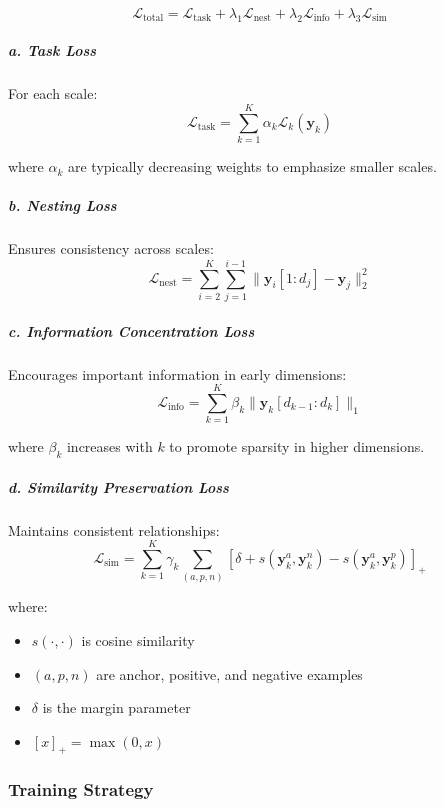 \begin{equation}
    \mathcal{L}_{\text{total}} = \mathcal{L}_{\text{task}} + \lambda_1\mathcal{L}_{\text{nest}} + \lambda_2\mathcal{L}_{\text{info}} + \lambda_3\mathcal{L}_{\text{sim}}
\end{equation}

\subparagraph{a. Task Loss}
For each scale:
\begin{equation}
    \mathcal{L}_{\text{task}} = \sum_{k=1}^K \alpha_k \mathcal{L}_k(\mathbf{y}_k)
\end{equation}

where $\alpha_k$ are typically decreasing weights to emphasize smaller scales.

\subparagraph{b. Nesting Loss}
Ensures consistency across scales:
\begin{equation}
    \mathcal{L}_{\text{nest}} = \sum_{i=2}^K \sum_{j=1}^{i-1} \|\mathbf{y}_i[1:d_j] - \mathbf{y}_j\|_2^2
\end{equation}

\subparagraph{c. Information Concentration Loss}
Encourages important information in early dimensions:
\begin{equation}
    \mathcal{L}_{\text{info}} = \sum_{k=1}^K \beta_k \|\mathbf{y}_k[d_{k-1}:d_k]\|_1
\end{equation}

where $\beta_k$ increases with $k$ to promote sparsity in higher dimensions.

\subparagraph{d. Similarity Preservation Loss}
Maintains consistent relationships:
\begin{equation}
    \mathcal{L}_{\text{sim}} = \sum_{k=1}^K \gamma_k \sum_{(a,p,n)} [\delta + s(\mathbf{y}_k^a, \mathbf{y}_k^n) - s(\mathbf{y}_k^a, \mathbf{y}_k^p)]_+
\end{equation}

where:
\begin{itemize}
    \item $s(\cdot,\cdot)$ is cosine similarity
    \item $(a,p,n)$ are anchor, positive, and negative examples
    \item $\delta$ is the margin parameter
    \item $[x]_+ = \max(0,x)$
\end{itemize}

\subsubsection{Training Strategy}

